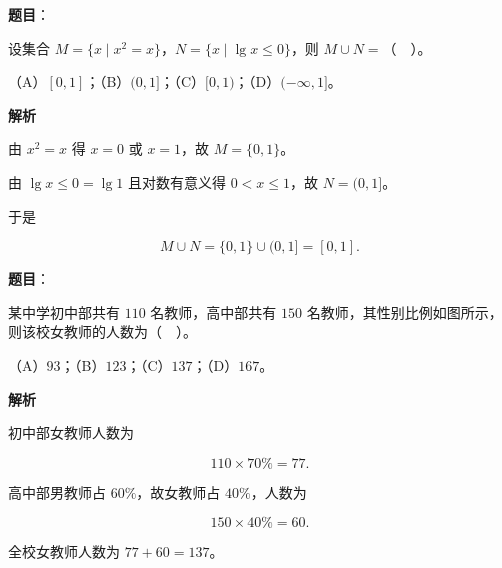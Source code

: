 


\begin{answer}

\textbf{题目}：

设集合 $M=\{x\mid x^{2}=x\}$，$N=\{x\mid \lg x\le 0\}$，则 $M\cup N=$（　）。

（A）$[0,1]$；（B）$(0,1]$；（C）$[0,1)$；（D）$(-\infty,1]$。

\textbf{解析}

由 $x^{2}=x$ 得 $x=0$ 或 $x=1$，故 $M=\{0,1\}$。

由 $\lg x\le 0=\lg 1$ 且对数有意义得 $0<x\le 1$，故 $N=(0,1]$。

于是

\nopagebreak[4]
\[
M\cup N=\{0,1\}\cup(0,1]=[0,1].
\]


\end{answer}
\begin{answer}

\textbf{题目}：

某中学初中部共有 $110$ 名教师，高中部共有 $150$ 名教师，其性别比例如图所示，则该校女教师的人数为（　）。
\nopagebreak[4]
\begin{center}\end{center}
\nopagebreak[4]
（A）$93$；（B）$123$；（C）$137$；（D）$167$。

\textbf{解析}

初中部女教师人数为

\nopagebreak[4]
\[
110\times 70\%=77.
\]

高中部男教师占 $60\%$，故女教师占 $40\%$，人数为

\nopagebreak[4]
\[
150\times 40\%=60.
\]

全校女教师人数为 $77+60=137$。


\end{answer}

